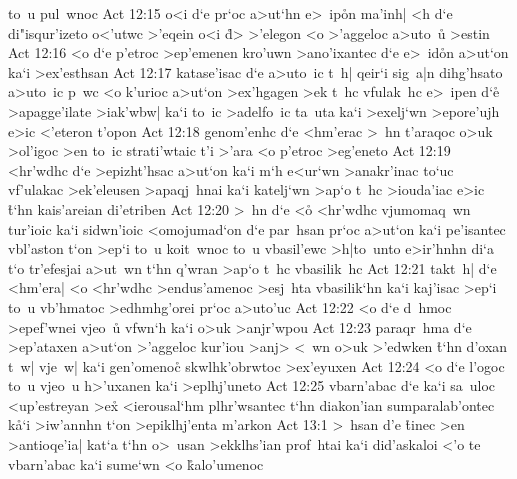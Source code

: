 to~u
pul~wnoc\bibvsend
\vs Act 12:15
o<i
d`e
pr`oc
a>ut`hn
e>~ip\r{o}n
ma'inh|
<h
d`e
di"isqur'izeto
o<'utwc
>'eqein
o<i
\r{d}>
>'elegon
<o
>'aggeloc
a>uto~u\r{}
>estin\bibvsend
\vs Act 12:16
<o
d`e
p'etroc
>ep'emenen
kro'uwn
>ano'ixantec
d`e
e>~id\r{o}n
a>ut`on
ka`i
>ex'esthsan\bibvsend
\vs Act 12:17
katase'isac
d`e
a>uto~ic
t~h|
qeir`i
sig~a|n
dihg'hsato
a>uto~ic
p~wc
<o
k'urioc
a>ut`on
>ex'hgagen
>ek
t~hc
vfulak~hc
e>~ipen
d`e\r{}
>apagge'ilate
>iak'wbw|
ka`i
to~ic
>adelfo~ic
ta~uta
ka`i
>exelj`wn
>epore'ujh
e>ic
<'eteron
t'opon\bibvsend
\vs Act 12:18
genom'enhc
d`e
<hm'erac
>~hn
t'araqoc
o>uk
>ol'igoc
>en
to~ic
strati'wtaic
t'i
>'ara
<o
p'etroc
>eg'eneto\bibvsend
\vs Act 12:19
<hr'wdhc
d`e
>epizht'hsac
a>ut`on
ka`i
m`h
e<ur`wn
>anakr'inac
to`uc
vf'ulakac
>ek'eleusen
>apaqj~hnai
ka`i
katelj`wn
>ap`o
t~hc
>iouda'iac
e>ic
\r{t}`hn
kais'areian
di'etriben\bibvsend
\vs Act 12:20
>~hn
d`e
<o\r{}
<hr'wdhc
vjumomaq~wn
tur'ioic
ka`i
sidwn'ioic
<omojumad`on
d`e
par~hsan
pr`oc
a>ut`on
ka`i
pe'isantec
vbl'aston
t`on
>ep`i
to~u
koit~wnoc
to~u
vbasil'ewc
>h|to~unto
e>ir'hnhn
di`a
t`o
tr'efesjai
a>ut~wn
t`hn
q'wran
>ap`o
t~hc
vbasilik~hc\bibvsend
\vs Act 12:21
takt~h|
d`e
<hm'era|
<o
<hr'wdhc
>endus'amenoc
>esj~hta
vbasilik`hn
ka`i
kaj'isac
>ep`i
to~u
vb'hmatoc
>edhmhg'orei
pr`oc
a>uto'uc\bibvsend
\vs Act 12:22
<o
d`e
d~hmoc
>epef'wnei
vjeo~u\r{}
vfwn`h
ka`i
o>uk
>anjr'wpou\bibvsend
\vs Act 12:23
paraqr~hma
d`e
>ep'ataxen
a>ut`on
>'aggeloc
kur'iou
>anj>
<~wn
o>uk
>'edwken
\r{t}`hn
d'oxan
t~w|
vje~w|
ka`i
gen'omenoc\r{}
skwlhk'obrwtoc
>ex'eyuxen\bibvsend
\vs Act 12:24
<o
d`e
l'ogoc
to~u
vjeo~u
h>'uxanen
ka`i
>eplhj'uneto\bibvsend
\vs Act 12:25
vbarn'abac
d`e
ka`i
sa~uloc
<up'estreyan
>ex\r{}
<ierousal`hm
plhr'wsantec
t`hn
diakon'ian
sumparalab'ontec
k\r{a}`i
>iw'annhn
t`on
>epiklhj'enta
m'arkon\bibvsend
\vs Act 13:1
>~hsan
d'e
\r{t}inec
>en
>antioqe'ia|
kat`a
t`hn
o>~usan
>ekklhs'ian
prof~htai
ka`i
did'askaloi
<'o
te
vbarn'abac
ka`i
sume`wn
<o
\r{k}alo'umenoc
